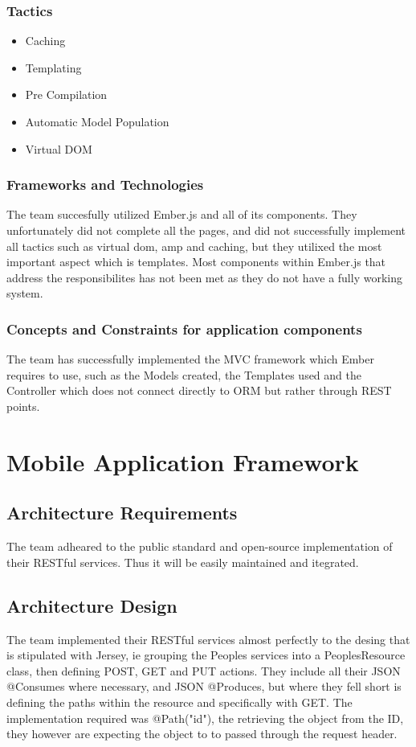 \documentclass[a4paper,10pt]{article}
\begin{document}
    \subsubsection{Tactics}
      \begin{itemize}
        \item Caching
        \item Templating
        \item Pre Compilation
        \item Automatic Model Population
        \item Virtual DOM
      \end{itemize}
    \subsubsection{Frameworks and Technologies}
      The team succesfully utilized Ember.js and all of its components. They unfortunately did not complete all the pages, and did not successfully implement all tactics such as virtual dom, amp and caching, but they utilixed the most important aspect which is templates. Most components within Ember.js that address the responsibilites has not been met as they do not have a fully working system.
    \subsubsection{Concepts and Constraints for application components}
      The team has successfully implemented the MVC framework which Ember requires to use, such as the Models created, the Templates used and the Controller which does not connect directly to ORM but rather through REST points.

\section{Mobile Application Framework}
  \subsection{Architecture Requirements}
    The team adheared to the public standard and open-source implementation of their RESTful services. Thus it will be easily maintained and itegrated.
  \subsection{Architecture Design}
    The team implemented their RESTful services almost perfectly to the desing that is stipulated with Jersey, ie grouping the Peoples services into a PeoplesResource class, then defining POST, GET and PUT actions. They include all their JSON @Consumes where necessary, and JSON @Produces, but where they fell short is defining the paths within the resource and specifically with GET. The implementation required was @Path("{id}"), the retrieving the object from the ID, they however are expecting the object to to passed through the request header.
\end{document}
